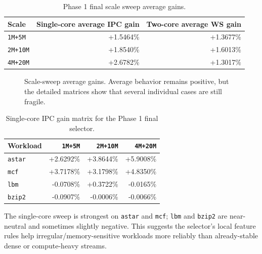 \documentclass[10pt,letterpaper]{article}
\newcommand{\pct}[1]{#1\%}
\newcommand{\code}[1]{\texttt{#1}}
\newcommand{\loss}[1]{\textcolor{bwcCoral}{#1}}
\begin{document}
\begin{table}[H]
\centering
\scriptsize
\caption{Phase 1 final scale sweep average gains.}
\label{tab:scaleavg}
\begin{tabular}{@{}lrr@{}}
\toprule
Scale & Single-core average IPC gain & Two-core average WS gain \\
\midrule
\code{1M+5M} & \pct{+1.5464} & \pct{+1.3677} \\
\code{2M+10M} & \pct{+1.8540} & \pct{+1.6013} \\
\code{4M+20M} & \pct{+2.6782} & \pct{+1.3017} \\
\bottomrule
\end{tabular}
\end{table}

\begin{figure}[H]
\centering
{}
\caption{Scale-sweep average gains. Average behavior remains positive, but the detailed matrices show that several individual cases are still fragile.}
\label{fig:scaleavg}
\end{figure}

\begin{table}[!htbp]
\centering
\scriptsize
\caption{Single-core IPC gain matrix for the Phase 1 final selector.}
\label{tab:singlematrix}
\begin{tabular}{@{}lrrr@{}}
\toprule
Workload & \code{1M+5M} & \code{2M+10M} & \code{4M+20M} \\
\midrule
\code{astar} & \pct{+2.6292} & \pct{+3.8644} & \pct{+5.9008} \\
\code{mcf} & \pct{+3.7178} & \pct{+3.1798} & \pct{+4.8350} \\
\code{lbm} & \loss{\pct{-0.0708}} & \pct{+0.3722} & \loss{\pct{-0.0165}} \\
\code{bzip2} & \loss{\pct{-0.0907}} & \loss{\pct{-0.0006}} & \loss{\pct{-0.0066}} \\
\bottomrule
\end{tabular}
\end{table}
The single-core sweep is strongest on \code{astar} and \code{mcf}; \code{lbm}
and \code{bzip2} are near-neutral and sometimes slightly negative. This suggests
the selector's local feature rules help irregular/memory-sensitive workloads
more reliably than already-stable dense or compute-heavy streams.
\end{document}
